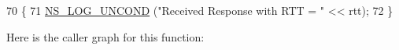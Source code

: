 \begin{DoxyCode}
70 \{
71   \hyperlink{log-macros-disabled_8h_a0b36e5e182b37194f85ef1c5e979fb2e}{NS\_LOG\_UNCOND} (\textcolor{stringliteral}{"Received Response with RTT = "} << rtt);
72 \}
\end{DoxyCode}


Here is the caller graph for this function\+:


